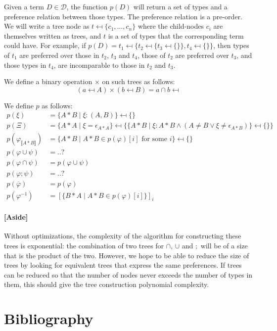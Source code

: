 \documentclass[12pt]{article}
\newcommand{\typetyped}[2]{{#1}_{\llbracket #2 \rrbracket}}
\newcommand{\conv}[1]{{#1}^{-1}}
\begin{document}
Given a term $D\in\mathcal{D}$, the function $p(D)$ will return a set of types and a preference relation between those types.
The preference relation is a pre-order.
We will write a tree node as $t \mapsfrom \{c_1,\ldots,c_n\}$ where the child-nodes $c_i$ are themselves written as trees, and $t$ is a set of types that the corresponding term could have.
For example, if $p(D) = t_1 \mapsfrom \{t_2 \mapsfrom \{t_3 \mapsfrom \{\}\},t_4 \mapsfrom \{\}\}$, then types of $t_1$ are preferred over those in $t_2$, $t_3$ and $t_4$, those of $t_2$ are preferred over $t_3$, and those types in $t_4$, are incomparable to those in $t_2$ and $t_3$.

We define a binary operation $\times$ on such trees as follows:
\[
(a \mapsfrom A) \times (b \mapsfrom B)
= a \cap b \mapsfrom 
\]

We define $p$ as follows:
\begin{align*}
p(\xi) &= \{{A*B} \mid \xi : (A,B)\}\mapsfrom\{\}\\
p(\Xi) &= \{{A*A} \mid \xi = \epsilon_{A*A}\}\mapsfrom \{\{{A*B} \mid \xi : {A*B} \wedge (A\neq B \vee \xi \neq \epsilon_{A*B})\} \mapsfrom\{\}\}\\
p(\typetyped{\varphi}{A*B}) &= \{A*B \mid A*B\in p(\varphi)[i] \text{ for some $i$}\}\mapsfrom\{\}\\
p(\varphi \cup \psi) &= ..?\\
p(\varphi \cap \psi) &= p(\varphi \cup \psi)\\
p(\varphi ; \psi) &= ..?\\
p(\overline{\varphi}) &= p(\varphi)\\
p(\conv{\varphi}) &= [\{B*A\mid A*B\in p(\varphi)[i]\}]_i
\end{align*}

\paragraph{[Aside]}
Without optimizations, the complexity of the algorithm for constructing these trees is exponential: the combination of two trees for $\cap$, $\cup$ and $;$ will be of a size that is the product of the two.
However, we hope to be able to reduce the size of trees by looking for equivalent trees that express the same preferences.
If trees can be reduced so that the number of nodes never exceeds the number of types in them, this should give the tree construction polynomial complexity.

\section{Bibliography}



\end{document}
